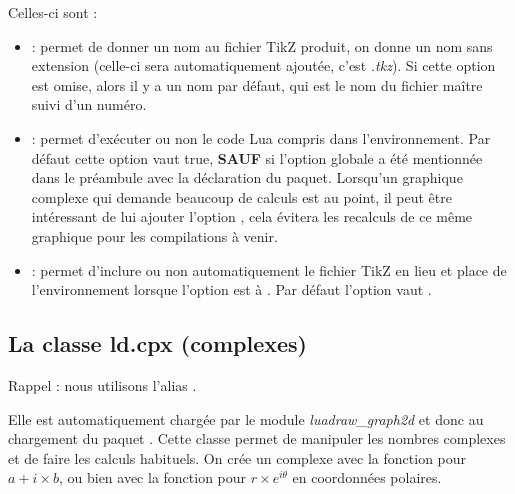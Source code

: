 Celles-ci sont :
\begin{itemize}
    \item {} : permet de donner un nom au fichier TikZ produit, on donne un nom sans extension (celle-ci sera automatiquement ajoutée, c'est \emph{.tkz}). Si cette option est omise, alors il y a un nom par défaut, qui est le nom du fichier maître suivi d'un numéro.
    
    \item {} : permet d'exécuter ou non le code Lua compris dans l'environnement. Par défaut cette option vaut true, \textbf{SAUF} si l'option globale  a été mentionnée dans le préambule avec la déclaration du paquet. Lorsqu'un graphique complexe qui demande beaucoup de calculs est au point, il peut être intéressant de lui ajouter l'option , cela évitera les recalculs de ce même graphique pour les compilations à venir.
    
    \item {} : permet d'inclure ou non automatiquement le fichier TikZ en lieu et place de l'environnement \luadrawenv lorsque l'option  est à \false. Par défaut l'option  vaut \true.
\end{itemize}


\subsection{La classe ld.cpx (complexes)}

Rappel : nous utilisons l'alias .

Elle est automatiquement chargée par le module \emph{luadraw\_graph2d} et donc au chargement du paquet \luadrawenv. Cette classe permet de manipuler les nombres complexes et de faire les calculs habituels. On crée un complexe avec la fonction  pour \(a+i\times b\), ou bien avec la fonction  pour \(r\times e^{i\theta}\) en coordonnées polaires.


